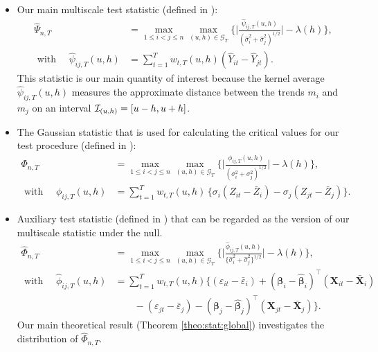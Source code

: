 \documentclass[a4paper,12pt]{article}
\makeatletter
\renewcommand{\eqref}[1]{\tagform@{\ref{#1}}}
\makeatother
\begin{document}
\begin{itemize}
\item Our main multiscale test statistic (defined in \eqref{eq:Psi_hat}):
\begin{align*}
	\widehat{\Psi}_{n,T} & = \max_{1 \le i < j \le n} \max_{(u,h) \in \mathcal{G}_T} \bigg\{\Big|\frac{\widehat{\psi}_{ij,T}(u,h)}{(\widehat{\sigma}_i^2 + \widehat{\sigma}_j^2)^{1/2}}\bigg| - \lambda(h)\Bigg\},\\
   \text{ with  } \quad    \widehat{\psi}_{ij,T}(u,h) &= \sum\limits_{t=1}^T w_{t,T}(u,h)(\widehat{Y}_{it} - \widehat{Y}_{jt}). \nonumber
\end{align*}
This statistic is our main quantity of interest because the kernel average $\widehat{\psi}_{ij,T}(u,h)$ measures the approximate distance between the trends $m_i$ and $m_j$ on an interval $\mathcal{I}_{(u, h)} = [u-h, u+h]$.


\item The Gaussian statistic that is used for calculating the critical values for our test procedure (defined in \eqref{eq:Phi}):
\begin{align*}
	\Phi_{n,T}  &= \max_{1 \le i < j \le n} \max_{(u,h) \in \mathcal{G}_T} \bigg\{\Big|\frac{\phi_{ij,T}(u,h)}{({\sigma}_i^2 + {\sigma}_j^2)^{1/2}}\Big| - \lambda(h)\bigg\},\\
   \text{ with  } \quad  	 \phi_{ij,T}(u,h) & = \sum\nolimits_{t=1}^T w_{t,T}(u,h) \, \big\{{\sigma}_i (Z_{it} - \bar{Z}_i) - {\sigma}_j (Z_{jt} - \bar{Z}_j) \big\}.\nonumber
\end{align*}

\item Auxiliary test statistic (defined in \eqref{eq:Phi_hat}) that can be regarded as the version of our multiscale statistic under the null.
\begin{align*}
	\widehat{\Phi}_{n,T} &= \max_{1 \le i < j \le n} \max_{(u,h) \in \mathcal{G}_T} \bigg\{\Big| \frac{\widehat{\phi}_{ij,T}(u,h)} {\{ \widehat{\sigma}_i^2 + \widehat{\sigma}_j^2 \}^{1/2}} \Big| - \lambda(h)\bigg\}, \\
   \text{ with  } \quad  	\widehat{\phi}_{ij,T}(u,h) &= \sum_{t=1}^T w_{t,T}(u,h) \big\{ (\varepsilon_{it} - \bar{\varepsilon}_i) + (\bm{\beta}_i - \widehat{\bm{\beta}}_i)^\top (\mathbf{X}_{it} - \bar{\mathbf{X}}_{i})  \nonumber \\
	&\quad\quad - (\varepsilon_{jt} - \bar{\varepsilon}_j) -  (\bm{\beta}_j - \widehat{\bm{\beta}}_j)^\top (\mathbf{X}_{jt} - \bar{\mathbf{X}}_{j})\big\}.\nonumber 
\end{align*}
Our main theoretical result (Theorem \ref{theo:stat:global}) investigates the distribution of $\widehat{\Phi}_{n,T}$.


\end{itemize}
\end{document}
